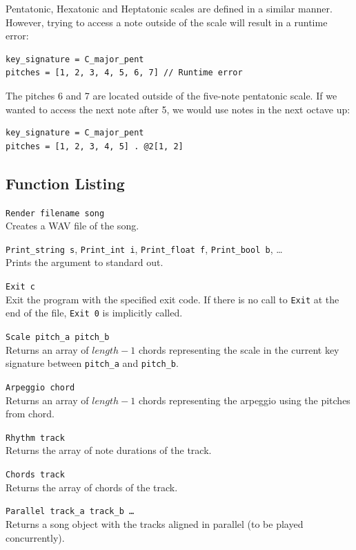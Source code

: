 \documentclass[11pt, onecolumn, letterpaper]{article}
\begin{document}
Pentatonic, Hexatonic and Heptatonic scales are defined in a similar manner. However, trying to access a note outside of the scale will result in a runtime error:

\begin{lstlisting}
key_signature = C_major_pent
pitches = [1, 2, 3, 4, 5, 6, 7] // Runtime error
\end{lstlisting}

The pitches 6 and 7 are located outside of the five-note pentatonic scale. If we wanted to access the next note after 5, we would use notes in the next octave up:

\begin{lstlisting}
key_signature = C_major_pent
pitches = [1, 2, 3, 4, 5] . @2[1, 2]
\end{lstlisting}

\subsection{Function Listing}

\texttt{Render filename song} \\ Creates a WAV file of the song.

\texttt{Print\_string s}, \texttt{Print\_int i}, \texttt{Print\_float f}, \texttt{Print\_bool b}, \ldots \\
Prints the argument to standard out.

\texttt{Exit c} \\ Exit the program with the specified exit code. If there is no call to \texttt{Exit} at the end of the file, \texttt{Exit 0} is implicitly called.

\texttt{Scale pitch\_a pitch\_b} \\ Returns an array of $ length-1 $ chords representing the scale in the current key signature between \texttt{pitch\_a} and \texttt{pitch\_b}.

\texttt{Arpeggio chord} \\ Returns an array of $ length-1 $ chords representing the arpeggio using the pitches from chord.

\texttt{Rhythm track} \\ Returns the array of note durations of the track.

\texttt{Chords track} \\ Returns the array of chords of the track.

\texttt{Parallel track\_a track\_b \ldots} \\ Returns a song object with the tracks aligned in parallel (to be played concurrently).
\end{document}
